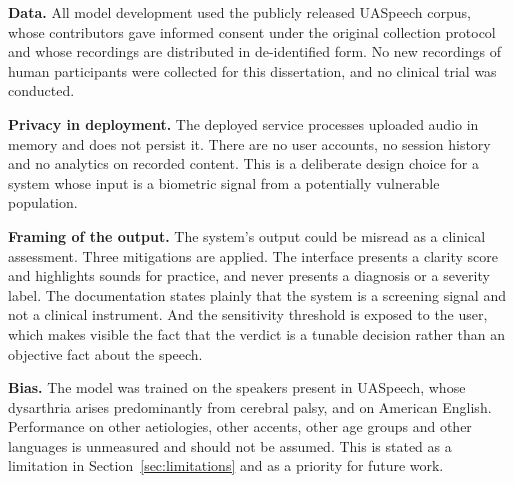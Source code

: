 \textbf{Data.} All model development used the publicly released UASpeech
corpus, whose contributors gave informed consent under the original collection
protocol and whose recordings are distributed in de-identified form. No new
recordings of human participants were collected for this dissertation, and no
clinical trial was conducted.

\textbf{Privacy in deployment.} The deployed service processes uploaded audio in
memory and does not persist it. There are no user accounts, no session history
and no analytics on recorded content. This is a deliberate design choice for a
system whose input is a biometric signal from a potentially vulnerable
population.

\textbf{Framing of the output.} The system's output could be misread as a
clinical assessment. Three mitigations are applied. The interface presents a
clarity score and highlights sounds for practice, and never presents a
diagnosis or a severity label. The documentation states plainly that the system
is a screening signal and not a clinical instrument. And the sensitivity
threshold is exposed to the user, which makes visible the fact that the verdict
is a tunable decision rather than an objective fact about the speech.

\textbf{Bias.} The model was trained on the speakers present in UASpeech, whose
dysarthria arises predominantly from cerebral palsy, and on American English.
Performance on other aetiologies, other accents, other age groups and other
languages is unmeasured and should not be assumed. This is stated as a
limitation in Section~\ref{sec:limitations} and as a priority for future work.
